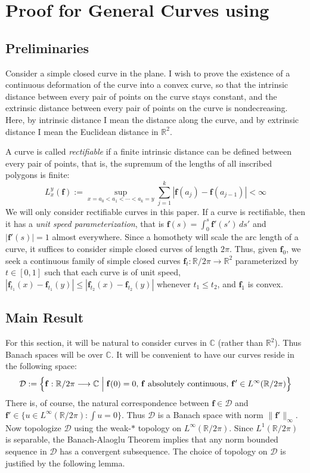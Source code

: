 \documentclass{amsart}
\newcommand{\C}			{\mathbb C}
\newcommand{\R}			{\mathbb R}
\newcommand{\f}			{\mathbf f}
\newcommand{\map}		{\longrightarrow}
\newcommand{\Linfty}	{L^\infty}
\newcommand{\Lone}		{L^1}
\numberwithin{equation}{section}
\begin{document}
\section{Proof for General Curves using \cite{cdr}}\label{cpx}

\subsection{Preliminaries}

Consider a simple closed curve in the plane.  I wish to prove 
the existence of a continuous deformation of the curve into 
a convex curve, so that the intrinsic distance between every 
pair of points on the curve stays constant, and the extrinsic 
distance between every pair of points on the curve is 
nondecreasing.  Here, by intrinsic distance I mean the distance 
along the curve, and by extrinsic distance I mean the Euclidean 
distance in $\R^2$.

A curve is called {\it rectifiable} if a finite intrinsic 
distance can be defined between every pair of points, that is, 
the supremum of the lengths of all inscribed 
polygons is finite:
\begin{equation}
L_x^y(\f):=\sup_{x=a_0<a_1<\cdots<a_k=y}\sum_{j=1}^k|\f(a_j)-\f(a_{j-1})|<\infty
\end{equation}
We will only consider rectifiable curves in 
this paper.  If a curve is rectifiable, then it has a {\it unit 
speed parameterization}, that is $\f(s)=\int_0^s\f'(s')\,ds'$ and 
$|\f'(s)|=1$ almost everywhere.  Since a homothety will scale the 
arc length of a curve, it suffices to consider simple closed 
curves of length $2\pi$.  Thus, given $\f_0$, we seek a 
continuous family of simple closed curves $\f_t:\R/2\pi\map\R^2$ 
parameterized by $t\in[0,1]$ such that each curve is of unit 
speed, $|\f_{t_1}(x)-\f_{t_1}(y)|\leq|\f_{t_2}(x)-\f_{t_2}(y)|$ 
whenever $t_1\leq t_2$, and $\f_1$ is convex.

\subsection{Main Result}

For this section, it will be natural to consider curves 
in $\C$ (rather than $\R^2$).  Thus Banach spaces will be 
over $\C$.  It will be convenient to have our curves 
reside in the following space:
\begin{equation}
\mathcal D:=\left\{\f:\R/2\pi\map\C\Bigm|
\text{$\f(0)=0$, $\f$ absolutely continuous, $\f'\in\Linfty(\R/2\pi)$}\right\}
\end{equation}
There is, of course, the natural correspondence between 
$\f\in\mathcal D$ and $\f'\in\{u\in\Linfty(\R/2\pi):\int u=0\}$.  
Thus $\mathcal D$ is a Banach space with norm $\|\f'\|_\infty$.  Now 
topologize $\mathcal D$ using the weak-$*$ topology on 
$\Linfty(\R/2\pi)$.  Since $\Lone(\R/2\pi)$ is separable, 
the Banach-Alaoglu Theorem implies that any norm bounded 
sequence in $\mathcal D$ has a convergent subsequence.  
The choice of topology on $\mathcal D$ is justified by 
the following lemma.
\end{document}
